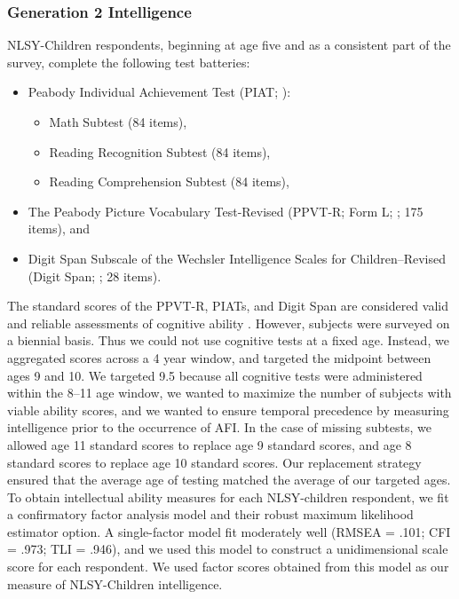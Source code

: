 \subsubsection{Generation 2 Intelligence}
NLSY-Children respondents, beginning at age five and as a consistent part of the survey, complete the following test batteries: \begin{itemize}
\item Peabody Individual Achievement Test (PIAT; \citealp{dunn1970peabody}):\begin{itemize}\item Math Subtest (84 items),
\item Reading Recognition Subtest (84 items),
\item Reading Comprehension Subtest (84 items),\end{itemize}
\item The Peabody Picture Vocabulary Test-Revised (PPVT-R; Form L; \citealp{dunn1981peabody}; 175 items), and
\item Digit Span Subscale of the Wechsler Intelligence Scales for Children--Revised (Digit Span; \citealp{wechsler1974manual}; 28 items).\end{itemize}
The standard scores of the PPVT-R, PIATs, and Digit Span are considered valid and reliable assessments of cognitive ability \citep{mott1995nlsy}. However, subjects were surveyed on a biennial basis. Thus we could not use cognitive tests at a fixed age. Instead, we aggregated scores across a 4 year window, and targeted the midpoint between ages 9 and 10. We targeted 9.5 because all cognitive tests were administered within the 8--11 age window, we wanted to maximize the number of subjects with viable ability scores, and we wanted to ensure temporal precedence by measuring intelligence prior to the occurrence of AFI. In the case of missing subtests, we allowed age 11 standard scores to replace age 9 standard scores, and age 8 standard scores to replace age 10 standard scores. Our replacement strategy ensured that the average age of testing matched the average of our targeted ages. To obtain intellectual ability measures for each NLSY-children respondent, we fit a confirmatory factor analysis model \citep[using Mplus;][]{mplus} and their robust maximum likelihood estimator option. A single-factor model fit moderately well (RMSEA = .101; CFI = .973; TLI = .946), and we used this model to construct a unidimensional scale score for each respondent. We used factor scores obtained from this model as our measure of NLSY-Children intelligence.

